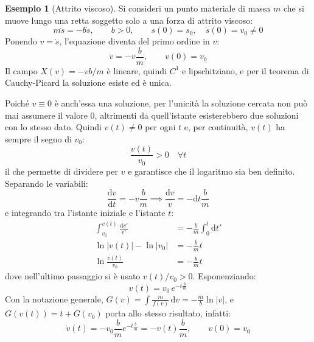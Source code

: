 \documentclass[11pt, a4paper, openright]{book}
\theoremstyle{plain}
\theoremstyle{definition}
\newtheorem{esempio}[teorema]{Esempio}
\theoremstyle{remark}
\begin{document}
\begin{esempio}[Attrito viscoso]
    Si consideri un punto materiale di massa $m$ che si muove lungo una retta soggetto solo a una forza di attrito viscoso:
    \begin{equation}
        m\ddot{s} = -b\dot{s}, \qquad b > 0, \qquad s(0) = s_0, \quad \dot{s}(0) = v_0 \neq 0
    \end{equation}
    Ponendo $v = \dot{s}$, l'equazione diventa del primo ordine in $v$:
    \begin{equation}
        \dot{v} = -v\frac{b}{m}, \qquad v(0) = v_0
    \end{equation}
    Il campo $X(v) = -vb/m$ è lineare, quindi $C^1$ e lipschitziano, e per il teorema di Cauchy-Picard la soluzione esiste ed è unica.

    Poiché $v \equiv 0$ è anch'essa una soluzione, per l'unicità la soluzione cercata non può mai assumere il valore $0$, altrimenti da quell'istante esisterebbero due soluzioni con lo stesso dato. Quindi $v(t) \neq 0$ per ogni $t$ e, per continuità, $v(t)$ ha sempre il segno di $v_0$:
    \begin{equation}
        \frac{v(t)}{v_0} > 0 \quad \forall t
    \end{equation}
    il che permette di dividere per $v$ e garantisce che il logaritmo sia ben definito. Separando le variabili:
    \begin{equation}
        \frac{\mathrm{d}v}{\mathrm{d}t} = -v\frac{b}{m} \implies \frac{\mathrm{d}v}{v} = -\mathrm{d}t\frac{b}{m}
    \end{equation}
    e integrando tra l'istante iniziale e l'istante $t$:
    \begin{align}
        \int_{v_0}^{v(t)} \frac{\mathrm{d}v'}{v'} &= -\frac{b}{m}\int_{0}^{t} \mathrm{d}t' \\
        \ln|v(t)| - \ln|v_0| &= -\frac{b}{m}t \\
        \ln\frac{v(t)}{v_0} &= -\frac{b}{m}t
    \end{align}
    dove nell'ultimo passaggio si è usato $v(t)/v_0 > 0$. Esponenziando:
    \begin{equation}
        v(t) = v_0\, e^{-t\frac{b}{m}}
    \end{equation}
    Con la notazione generale, $G(v) = \int \frac{m}{f(v)}\,\mathrm{d}v = -\frac{m}{b} \ln|v|$, e $G(v(t)) = t + G(v_0)$ porta allo stesso risultato, infatti:
    \begin{equation}
        \dot{v}(t) = -v_0\frac{b}{m}e^{-t\frac{b}{m}} = -v(t)\frac{b}{m}, \qquad v(0) = v_0
    \end{equation}


\end{esempio}
\end{document}
